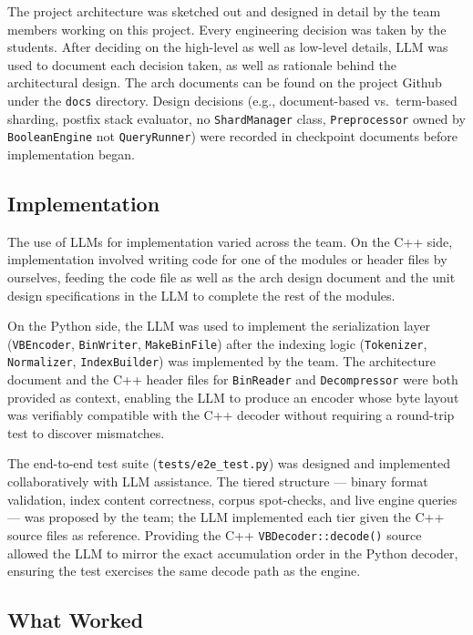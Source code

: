 \documentclass[twocolumn, 10pt]{article}
\begin{document}
The project architecture was sketched out and designed in detail by the team
members working on this project. Every engineering decision was taken by the
students. After deciding on the high-level as well as low-level details, LLM
was used to document each decision taken, as well as rationale behind the
architectural design. The arch documents can be found on the project Github
under the \texttt{docs} directory. Design decisions (e.g.,
document-based vs.\ term-based sharding, postfix stack evaluator, no
\texttt{ShardManager} class, \texttt{Preprocessor} owned by
\texttt{BooleanEngine} not \texttt{QueryRunner}) were recorded in checkpoint
documents before implementation began.

\subsection{Implementation}

The use of LLMs for implementation varied across the team. On the C++ side,
implementation involved writing code for one of the modules or header files
by ourselves, feeding the code file as well as the arch design document and
the unit design specifications in the LLM to complete the rest of the modules.

On the Python side, the LLM was used to implement the serialization layer
(\texttt{VBEncoder}, \texttt{BinWriter}, \texttt{MakeBinFile}) after the
indexing logic (\texttt{Tokenizer}, \texttt{Normalizer}, \texttt{IndexBuilder})
was implemented by the team. The architecture document and the C++ header
files for \texttt{BinReader} and \texttt{Decompressor} were both provided
as context, enabling the LLM to produce an encoder whose byte layout was
verifiably compatible with the C++ decoder without requiring a round-trip
test to discover mismatches.

The end-to-end test suite (\texttt{tests/e2e\_test.py}) was designed and
implemented collaboratively with LLM assistance. The tiered structure ---
binary format validation, index content correctness, corpus spot-checks,
and live engine queries --- was proposed by the team; the LLM implemented
each tier given the C++ source files as reference. Providing the C++
\texttt{VBDecoder::decode()} source allowed the LLM to mirror the exact
accumulation order in the Python decoder, ensuring the test exercises the
same decode path as the engine.

\subsection{What Worked}
\end{document}
